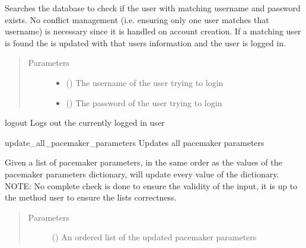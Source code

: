 \documentclass[letterpaper,10pt,english]{sphinxmanual}
\begin{document}
\begin{fulllineitems}
\begin{fulllineitems}
Searches the database to check if the user with matching username and
password exists. No conflict management (i.e. ensuring only one user
matches that username) is necessary since it is handled on account
creation. If a matching user is found the {\hyperref[\detokenize{index:module-data.user}]{}} is updated
with that users information and the user is logged in.
\begin{quote}\begin{description}
\item[{Parameters}] \leavevmode\begin{itemize}
\item {} 
 () \textendash{} The username of the user trying to login

\item {} 
 () \textendash{} The password of the user trying to login

\end{itemize}

\end{description}\end{quote}

\end{fulllineitems}


\begin{fulllineitems}
\label{\detokenize{index:data.user.User.logout}}
logout Logs out the currently logged in user

\end{fulllineitems}


\begin{fulllineitems}
\label{\detokenize{index:data.user.User.update_all_pacemaker_parameters}}
update\_all\_pacemaker\_parameters Updates all pacemaker parameters

Given a list of pacemaker parameters, in the same order as the values of
the pacemaker parameters dictionary, will update every value of the dictionary.
NOTE: No complete check is done to ensure the validity of the input, it is up
to the method user to ensure the lists correctness.
\begin{quote}\begin{description}
\item[{Parameters}] \leavevmode
{} () \textendash{} An ordered list of the updated pacemaker parameters


\end{description}
\end{quote}
\end{fulllineitems}
\end{fulllineitems}
\end{document}
